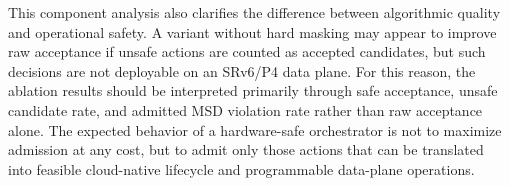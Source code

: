 \documentclass[final,5p]{elsarticle}
\begin{document}
This component analysis also clarifies the difference between algorithmic quality and operational safety. A variant without hard masking may appear to improve raw acceptance if unsafe actions are counted as accepted candidates, but such decisions are not deployable on an SRv6/P4 data plane. For this reason, the ablation results should be interpreted primarily through safe acceptance, unsafe candidate rate, and admitted MSD violation rate rather than raw acceptance alone. The expected behavior of a hardware-safe orchestrator is not to maximize admission at any cost, but to admit only those actions that can be translated into feasible cloud-native lifecycle and programmable data-plane operations.
\begin{table}[t]
\centering
\caption{Ablation results on the Vietnam topology. All percentage columns are reported in \%.}
\label{tab:vietnam_ablation_summary}
\renewcommand{\arraystretch}{1.12}
\setlength{\tabcolsep}{2pt}
\scriptsize
{}
\end{table}
\end{document}
